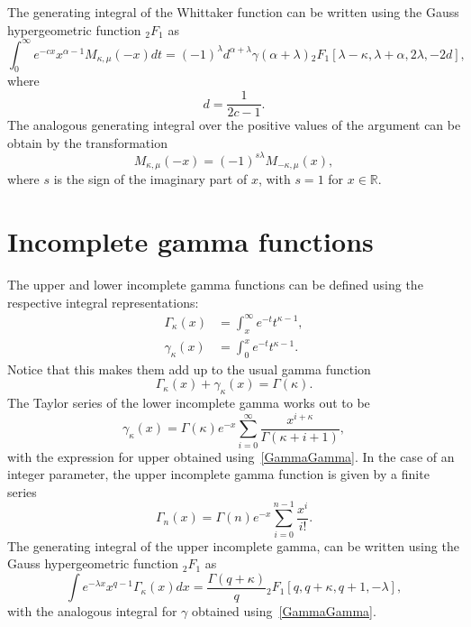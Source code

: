 The generating integral of the Whittaker function can be written using the Gauss hypergeometric function ${}_2F_1$ as
\begin{equation}
   \int_0^{\infty}e^{-c x}x^{\alpha-1} M_{\kappa,\mu}(-x)dt = (-1)^\lambda d^{\alpha+\lambda}\gamma(\alpha+\lambda){}_2F_1\left[\lambda-\kappa,\lambda+\alpha,2\lambda,-2d\right],
\end{equation}
where
\begin{equation}
   d=\frac{1}{2c-1}.
\end{equation}
The analogous generating integral over the positive values of the argument can be obtain by the transformation
\begin{equation}
M_{\kappa,\mu}(-x) = (-1)^{s\lambda}M_{-\kappa,\mu}(x),
\end{equation}
where $s$ is the sign of the imaginary part of $x$, with $s=1$ for $x \in \mathbb{R}$.

\section{Incomplete gamma functions}
\label{app:Gamma}

The upper and lower incomplete gamma functions can be defined using the respective integral representations:
\begin{subequations}
\begin{align}
    \Gamma_\kappa(x)&=\int_x^\infty e^{-t}t^{\kappa-1},
    \\
    \gamma_\kappa(x)&=\int_0^x e^{-t}t^{\kappa-1}.
\end{align}
\end{subequations}
Notice that this makes them add up to the usual gamma function
\begin{equation}\label{GammaGamma}
    \Gamma_\kappa(x)+\gamma_\kappa(x)=\Gamma(\kappa).
\end{equation}
The Taylor series of the lower incomplete gamma works out to be
\begin{equation}
    \gamma_\kappa(x)=\Gamma(\kappa)e^{-x}\sum_{i=0}^{\infty}\frac{x^{i+\kappa}}{\Gamma(\kappa+i+1)},
\end{equation}
with the expression for upper obtained using~\eqref{GammaGamma}. In the case of an integer parameter, the upper incomplete gamma function is given by a finite series
\begin{equation}
    \Gamma_n(x)=\Gamma(n)e^{-x}\sum_{i=0}^{n-1}\frac{x^{i}}{i!}.
\end{equation}
The generating integral of the upper incomplete gamma, can be written using the Gauss hypergeometric function ${}_2F_1$ as
\begin{equation}
\int e^{-\lambda x}x^{q-1}\Gamma_\kappa(x)dx = \frac{\Gamma(q+\kappa)}{q}{}_2F_1[q,q+\kappa,q+1,-\lambda],
\end{equation}
with the analogous integral for $\gamma$ obtained using~\eqref{GammaGamma}.

